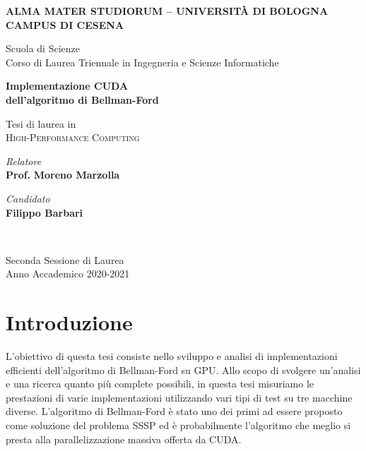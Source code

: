 \documentclass[12pt,a4paper,oneside]{book}
\begin{document}
	
	\begin{titlepage}
		\begin{center}
			\large
			\textbf{ALMA MATER STUDIORUM -- UNIVERSITÀ DI BOLOGNA \\ CAMPUS DI CESENA} \\
			\noindent\hrulefill
			\vspace{0.4cm}
			
			\Large
			Scuola di Scienze \\
			Corso di Laurea Triennale in Ingegneria e Scienze Informatiche
			
			\Huge
			\vspace{4cm}
			\textbf{
				Implementazione CUDA \\
				dell'algoritmo di Bellman-Ford
			}
			
			\large
			\vspace{1cm}
			Tesi di laurea in \\
			\textsc{High-Performance Computing}
			
			\vspace{5.5cm}
			\begin{minipage}[t]{0.64\textwidth}
				\begin{flushleft}
					\textit{Relatore} \\ 
					\textbf{Prof.} \textbf{Moreno Marzolla}
				\end{flushleft}
			\end{minipage}
			\begin{minipage}[t]{0.34\textwidth}
				\begin{flushright}
					\textit{Candidato} \\ 
					\textbf{Filippo Barbari}
				\end{flushright}
			\end{minipage}\\
			\vfill
			\noindent\hrulefill
			\vspace{0.3cm}
			
			\Large
			Seconda Sessione di Laurea \\
			Anno Accademico 2020-2021
		\end{center}
	\end{titlepage}
	\restoregeometry

	\tableofcontents
	\listoffigures
	\listoftables
	\listofalgorithms
	
	\chapter*{Introduzione}
	L'obiettivo di questa tesi consiste nello sviluppo e analisi di implementazioni efficienti dell'algoritmo di Bellman-Ford su GPU. Allo scopo di svolgere un'analisi e una ricerca quanto più complete possibili, in questa tesi misuriamo le prestazioni di varie implementazioni utilizzando vari tipi di test su tre macchine diverse. L'algoritmo di Bellman-Ford è stato uno dei primi ad essere proposto come soluzione del problema SSSP ed è probabilmente l'algoritmo che meglio si presta alla parallelizzazione massiva offerta da CUDA.
	
\end{document}
